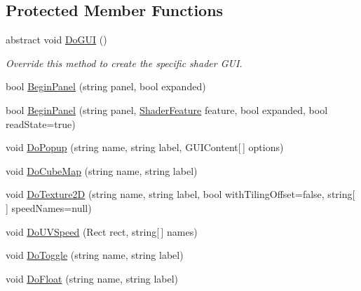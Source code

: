 \subsection*{Protected Member Functions}
\begin{DoxyCompactItemize}
\item 
abstract void \mbox{\hyperlink{class_t_m_pro_1_1_editor_utilities_1_1_t_m_p___base_shader_g_u_i_a04c57cff2c8f6cf93b5bf50209ef9f5f}{Do\+G\+UI}} ()
\begin{DoxyCompactList}\small\item\em Override this method to create the specific shader G\+UI. \end{DoxyCompactList}\item 
bool \mbox{\hyperlink{class_t_m_pro_1_1_editor_utilities_1_1_t_m_p___base_shader_g_u_i_a025663da6334820f0831da1f2b93acb4}{Begin\+Panel}} (string panel, bool expanded)
\item 
bool \mbox{\hyperlink{class_t_m_pro_1_1_editor_utilities_1_1_t_m_p___base_shader_g_u_i_afe82d9e4c02166aa2223f7b4bb64e479}{Begin\+Panel}} (string panel, \mbox{\hyperlink{class_t_m_pro_1_1_editor_utilities_1_1_t_m_p___base_shader_g_u_i_1_1_shader_feature}{Shader\+Feature}} feature, bool expanded, bool read\+State=true)
\item 
void \mbox{\hyperlink{class_t_m_pro_1_1_editor_utilities_1_1_t_m_p___base_shader_g_u_i_a89a098396bd3d15f1657932e598cd989}{Do\+Popup}} (string name, string label, G\+U\+I\+Content\mbox{[}$\,$\mbox{]} options)
\item 
void \mbox{\hyperlink{class_t_m_pro_1_1_editor_utilities_1_1_t_m_p___base_shader_g_u_i_a4a49537dbf39132cc76f9f7aa54b3ccb}{Do\+Cube\+Map}} (string name, string label)
\item 
void \mbox{\hyperlink{class_t_m_pro_1_1_editor_utilities_1_1_t_m_p___base_shader_g_u_i_abdebef0320477a84a0a1fa5ed036866b}{Do\+Texture2D}} (string name, string label, bool with\+Tiling\+Offset=false, string\mbox{[}$\,$\mbox{]} speed\+Names=null)
\item 
void \mbox{\hyperlink{class_t_m_pro_1_1_editor_utilities_1_1_t_m_p___base_shader_g_u_i_aae11df19c3e706f686799da96eab4ea8}{Do\+U\+V\+Speed}} (Rect rect, string\mbox{[}$\,$\mbox{]} names)
\item 
void \mbox{\hyperlink{class_t_m_pro_1_1_editor_utilities_1_1_t_m_p___base_shader_g_u_i_a3197f15b4a17cdac8e7c1330c4fb4630}{Do\+Toggle}} (string name, string label)
\item 
void \mbox{\hyperlink{class_t_m_pro_1_1_editor_utilities_1_1_t_m_p___base_shader_g_u_i_a1d899f08dbbdbea230663af27915bd00}{Do\+Float}} (string name, string label)

\end{DoxyCompactItemize}
